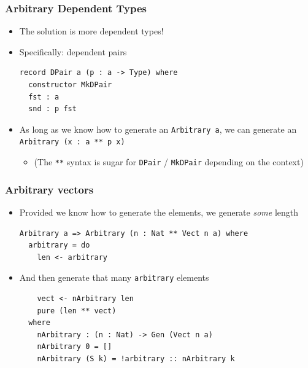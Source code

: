 \documentclass[compress,handout]{beamer}
\begin{document}
\begin{frame}[fragile]
  \frametitle{Arbitrary Dependent Types}

  \begin{itemize}
    \item<1-> The solution is more dependent types!
    \item<2-> Specifically: dependent pairs

    \begin{verbatim}
record DPair a (p : a -> Type) where
  constructor MkDPair
  fst : a
  snd : p fst
    \end{verbatim}

    \item<3-> As long as we know how to generate an {\textasciigrave
              \texttt{Arbitrary a}\textasciigrave}, we can generate
              an {\textasciigrave
              \texttt{Arbitrary (x : a ** p x)}\textasciigrave}
    \begin{itemize}
      \item<3-> (The \texttt{**} syntax is sugar for
                \texttt{DPair} / \texttt{MkDPair}
                depending on the context)
    \end{itemize}
  \end{itemize}

\end{frame}


\begin{frame}[fragile]
  \frametitle{Arbitrary vectors}

  \begin{itemize}
  \item<1-> Provided we know how to generate the elements, we generate
            \textit{some} length
            \begin{verbatim}
Arbitrary a => Arbitrary (n : Nat ** Vect n a) where
  arbitrary = do
    len <- arbitrary
            \end{verbatim}
  \item<2-> And then generate that many \texttt{arbitrary}
            elements
            \begin{verbatim}
    vect <- nArbitrary len
    pure (len ** vect)
  where
    nArbitrary : (n : Nat) -> Gen (Vect n a)
    nArbitrary 0 = []
    nArbitrary (S k) = !arbitrary :: nArbitrary k
            \end{verbatim}
  \vspace*{-5mm}
  \end{itemize}

\end{frame}
\end{document}
